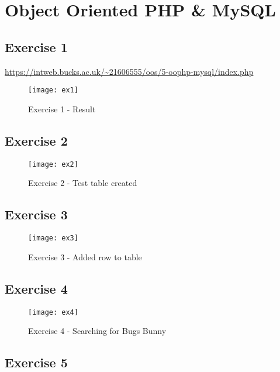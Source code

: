 \chapter{Object Oriented PHP \& MySQL}
\graphicspath{{5-oophp-mysql/images/}}

\section{Exercise 1}

\url{https://intweb.bucks.ac.uk/~21606555/oos/5-oophp-mysql/index.php}

\captionsetup{type=figure}


\captionsetup{type=figure}


\begin{figure}[H]
  \caption{Exercise 1 - Result}
  \centering
  \texttt{[image: ex1]}
\end{figure}

\section{Exercise 2}

\begin{figure}[H]
  \caption{Exercise 2 - Test table created}
  \centering
  \texttt{[image: ex2]}
\end{figure}

\section{Exercise 3}

\begin{figure}[H]
  \caption{Exercise 3 - Added row to table}
  \centering
  \texttt{[image: ex3]}
\end{figure}

\section{Exercise 4}

\begin{figure}[H]
  \caption{Exercise 4 - Searching for Bugs Bunny}
  \centering
  \texttt{[image: ex4]}
\end{figure}

\section{Exercise 5}

